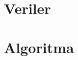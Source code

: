 \renewcommand{\appendixname}{}
\renewcommand{\appendixtocname}{EKLER}
\renewcommand{\appendixpagename}{EKLER}

\begin{appendices}
\appendix
\chapter{Veriler}



\chapter{Algoritma}
\end{appendices}